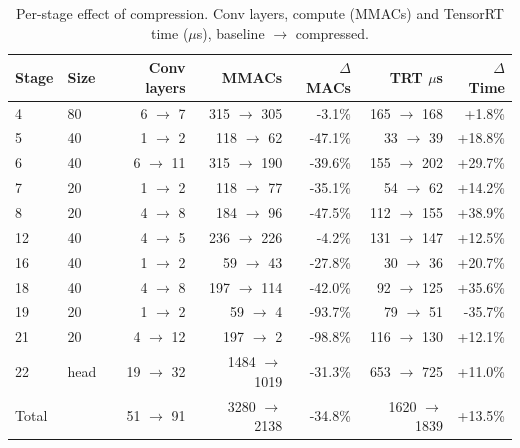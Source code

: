 \begin{table}[t]
\centering
\caption{Per-stage effect of compression. Conv layers, compute (MMACs) and TensorRT time ($\mu$s), baseline $\rightarrow$ compressed.}
\label{tab:lrf_stages}
\begin{tabular}{llrrrrr}
\toprule
Stage & Size & Conv layers & MMACs & $\Delta$MACs & TRT $\mu$s & $\Delta$Time \\
\midrule
4 & 80 & 6 $\rightarrow$ 7 & 315 $\rightarrow$ 305 & -3.1\% & 165 $\rightarrow$ 168 & +1.8\% \\
5 & 40 & 1 $\rightarrow$ 2 & 118 $\rightarrow$ 62 & -47.1\% & 33 $\rightarrow$ 39 & +18.8\% \\
6 & 40 & 6 $\rightarrow$ 11 & 315 $\rightarrow$ 190 & -39.6\% & 155 $\rightarrow$ 202 & +29.7\% \\
7 & 20 & 1 $\rightarrow$ 2 & 118 $\rightarrow$ 77 & -35.1\% & 54 $\rightarrow$ 62 & +14.2\% \\
8 & 20 & 4 $\rightarrow$ 8 & 184 $\rightarrow$ 96 & -47.5\% & 112 $\rightarrow$ 155 & +38.9\% \\
12 & 40 & 4 $\rightarrow$ 5 & 236 $\rightarrow$ 226 & -4.2\% & 131 $\rightarrow$ 147 & +12.5\% \\
16 & 40 & 1 $\rightarrow$ 2 & 59 $\rightarrow$ 43 & -27.8\% & 30 $\rightarrow$ 36 & +20.7\% \\
18 & 40 & 4 $\rightarrow$ 8 & 197 $\rightarrow$ 114 & -42.0\% & 92 $\rightarrow$ 125 & +35.6\% \\
19 & 20 & 1 $\rightarrow$ 2 & 59 $\rightarrow$ 4 & -93.7\% & 79 $\rightarrow$ 51 & -35.7\% \\
21 & 20 & 4 $\rightarrow$ 12 & 197 $\rightarrow$ 2 & -98.8\% & 116 $\rightarrow$ 130 & +12.1\% \\
22 & head & 19 $\rightarrow$ 32 & 1484 $\rightarrow$ 1019 & -31.3\% & 653 $\rightarrow$ 725 & +11.0\% \\
\midrule
Total &  & 51 $\rightarrow$ 91 & 3280 $\rightarrow$ 2138 & -34.8\% & 1620 $\rightarrow$ 1839 & +13.5\% \\
\bottomrule
\end{tabular}
\end{table}


